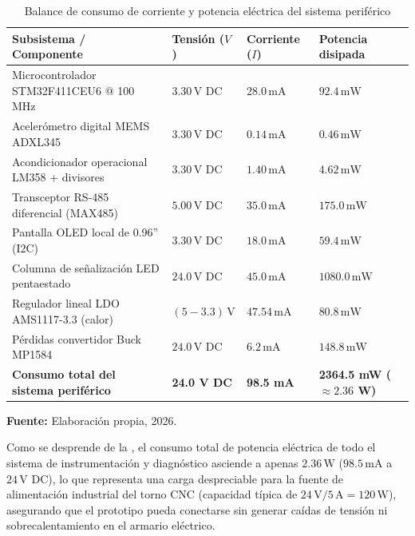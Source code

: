 {\setlength{\parskip}{1.5pt}
\begin{table}[H]
\centering
\caption{Balance de consumo de corriente y potencia eléctrica del sistema periférico}\label{tab:balance_potencia_hardware_mp}
\vspace{2mm}
\small
\begin{tabular}{p{5.5cm}p{2.2cm}p{2.2cm}p{3.5cm}}
\hline
\textbf{Subsistema / Componente} & \textbf{Tensión ($V$)} & \textbf{Corriente ($I$)} & \textbf{Potencia disipada} \\ \hline \hline
Microcontrolador STM32F411CEU6 @ 100 MHz & $3.30\,\text{V DC}$ & $28.0\,\text{mA}$ & $92.4\,\text{mW}$ \\ \hline
Acelerómetro digital MEMS ADXL345 & $3.30\,\text{V DC}$ & $0.14\,\text{mA}$ & $0.46\,\text{mW}$ \\ \hline
Acondicionador operacional LM358 + divisores & $3.30\,\text{V DC}$ & $1.40\,\text{mA}$ & $4.62\,\text{mW}$ \\ \hline
Transceptor RS-485 diferencial (MAX485) & $5.00\,\text{V DC}$ & $35.0\,\text{mA}$ & $175.0\,\text{mW}$ \\ \hline
Pantalla OLED local de 0.96'' (I2C) & $3.30\,\text{V DC}$ & $18.0\,\text{mA}$ & $59.4\,\text{mW}$ \\ \hline
Columna de señalización LED pentaestado & $24.0\,\text{V DC}$ & $45.0\,\text{mA}$ & $1080.0\,\text{mW}$ \\ \hline
Regulador lineal LDO AMS1117-3.3 (calor) & $(5 - 3.3)\,\text{V}$ & $47.54\,\text{mA}$ & $80.8\,\text{mW}$ \\ \hline
Pérdidas convertidor Buck MP1584 & $24.0\,\text{V DC}$ & $6.2\,\text{mA}$ & $148.8\,\text{mW}$ \\ \hline \hline
\textbf{Consumo total del sistema periférico} & \textbf{24.0 V DC} & \textbf{98.5 mA} & \textbf{2364.5 mW ($\approx 2.36$ W)} \\ \hline
\end{tabular}
\par\vspace{2mm}
\footnotesize \textbf{Fuente:} Elaboración propia, 2026.
\end{table}
}

Como se desprende de la , el consumo total de potencia eléctrica de todo el sistema de instrumentación y diagnóstico asciende a apenas $2.36\,\text{W}$ ($98.5\,\text{mA}$ a $24\,\text{V DC}$), lo que representa una carga despreciable para la fuente de alimentación industrial del torno CNC (capacidad típica de $24\,\text{V} / 5\,\text{A} = 120\,\text{W}$), asegurando que el prototipo pueda conectarse sin generar caídas de tensión ni sobrecalentamiento en el armario eléctrico.

